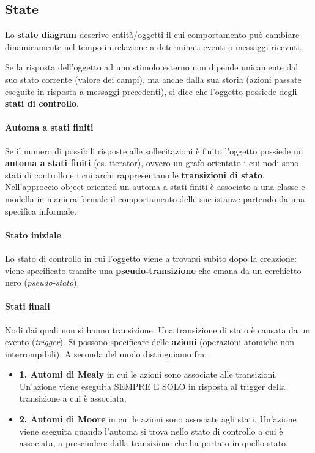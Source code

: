 \subsection{State}

Lo \textbf{state diagram} descrive entità/oggetti il cui comportamento può cambiare dinamicamente nel tempo in relazione a determinati eventi o messaggi ricevuti.

Se la risposta dell'oggetto ad uno stimolo esterno non dipende unicamente dal suo stato corrente (valore dei campi), ma anche dalla sua storia (azioni passate eseguite in risposta a messaggi precedenti), si dice che l'oggetto possiede degli \textbf{stati di controllo}.

\paragraph{Automa a stati finiti} Se il numero di possibili risposte alle sollecitazioni è finito l'oggetto possiede un \textbf{automa a stati finiti} (es. iterator), ovvero un grafo orientato i cui nodi sono stati di controllo e i cui archi rappresentano le \textbf{transizioni di stato}.
Nell'approccio object-oriented un automa a stati finiti è associato a una classe e modella in maniera formale il comportamento delle sue istanze partendo da una specifica informale.

\paragraph{Stato iniziale} Lo stato di controllo in cui l'oggetto viene a trovarsi subito dopo la creazione: viene specificato tramite una \textbf{pseudo-transizione} che emana da un cerchietto nero (\textit{pseudo-stato}).

\paragraph{Stati finali} Nodi dai quali non si hanno transizione. Una transizione di stato è causata da un evento (\textit{trigger}). Si possono specificare delle \textbf{azioni} (operazioni atomiche non interrompibili). A seconda del modo distinguiamo fra:
\begin{itemize}

    \item \textbf{1. Automi di Mealy} in cui le azioni sono associate alle transizioni. Un'azione viene eseguita SEMPRE E SOLO in risposta al trigger della transizione a cui è associata;

    \item  \textbf{2. Automi di Moore} in cui le azioni sono associate agli stati. Un'azione viene eseguita quando l'automa si trova nello stato di controllo a cui è associata, a prescindere dalla transizione che ha portato in quello stato.

\end{itemize}


